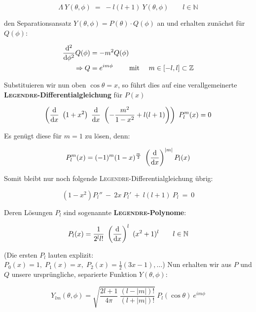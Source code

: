 \begin{equation*}
\Lambda \ Y(\theta,\phi) \; = \; -l(l+1) \ Y(\theta,\phi) \qquad l \in \mathbb{N}
\end{equation*}

den Separationsansatz $Y(\theta,\phi) = P(\theta)\cdot Q(\phi)$ an und erhalten zunächst für $Q(\phi)$:

\begin{align*}
\frac{\mathrm{d}^2{}}{\mathrm{d}{\phi}^2}Q(\phi) &= - m^2 Q(\phi)\\
\Rightarrow Q &= e^{im\phi} \qquad \text{ mit } \quad m \in [-l,l] \subset \mathbb{Z}
\end{align*}

Substituieren wir nun oben $\cos\theta = x$, so führt dies auf eine verallgemeinerte \textbf{\textsc{Legendre}-Differentialgleichung} für $P(x)$

\begin{equation*}
\left(\diff{}{x} \ \left(1+x^2\right) \ \diff{}{x} \ \left(-\frac{m^2}{1-x^2} + l(l+1)\right)\right) \ P_l^m(x) = 0
\end{equation*}

Es genügt diese für $m=1$ zu lösen, denn:

\begin{equation*}
P_l^m(x) = (-1)^m(1-x)^{\frac{m}{2}} \ \left(\diff{}{x}\right)^{|m|} P_l(x)
\end{equation*}

Somit bleibt nur noch folgende \textsc{Legendre}-Differentialgleichung übrig:

\begin{equation*}
(1-x^2) P_l'' \ - \ 2x \ P_l' \ + \ l(l+1) \ P_l \ = \ 0
\end{equation*}

Deren Lösungen $P_l$ sind sogenannte \textbf{\textsc{Legendre}-Polynome}:

\begin{equation*}
P_l(x) = \frac{1}{2^l l!} \ \left(\diff{}{x}\right)^l \ (x^2+1)^l \qquad l\in \mathbb{N}
\end{equation*}

(Die ersten $P_l$ lauten explizit: $P_0(x) =1, \; P_1(x) = x, \; P_2(x) = \frac{1}{2}(3x-1), \dotsc$)
Nun erhalten wir aus $P$ und $Q$ unsere ursprüngliche, separierte Funktion $Y(\theta,\phi)$:

\begin{equation*}
Y_{lm}(\theta,\phi) = \sqrt{\frac{2l + 1}{4\pi} \ \frac{(l-|m|)!}{(l+|m|)!}} \ P_l(\cos\theta) \ e^{im\phi}
\end{equation*}

